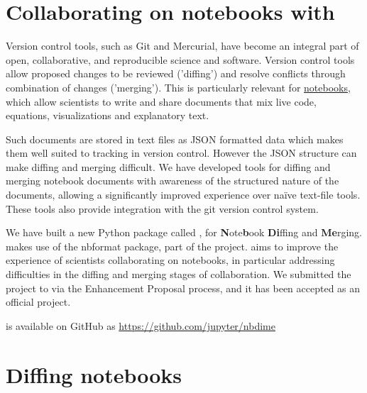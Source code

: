\documentclass{deliverablereport}
\author{Benjamin Ragan-Kelley \& Martin Sandve Aln\ae{}s \& Vidar Fauske}
\begin{document}
\maketitle
\githubissuedescription
\tableofcontents
\clearpage

\section{Collaborating on \Jupyter notebooks with \nbdime}

Version control tools, such as Git and Mercurial, have become an
integral part of open, collaborative, and reproducible science and
software. Version control tools allow proposed changes to be reviewed
('diffing') and resolve conflicts through combination of changes
('merging'). This is particularly relevant for
\href{http://jupyter.org}{\Jupyter notebooks}, which allow scientists
to write and share documents that mix live code, equations,
visualizations and explanatory text.

Such documents are stored in text files as JSON formatted data which
makes them well suited to tracking in version control. However the
JSON structure can make diffing and merging difficult.  We have
developed tools for diffing and merging notebook documents with
awareness of the structured nature of the documents, allowing a
significantly improved experience over naïve text-file tools.  These
tools also provide integration with the git version control system.

We have built a new Python package called \nbdime, for \textbf{N}ote\textbf{b}ook \textbf{Di}ffing and \textbf{Me}rging.
\nbdime makes use of the nbformat package, part of the \Jupyter project.
\nbdime aims to improve the experience of scientists collaborating on notebooks,
in particular addressing difficulties in the diffing and merging stages of collaboration.
We submitted the project to \Jupyter via the \Jupyter Enhancement Proposal process,
and it has been accepted as an official \Jupyter project.

\nbdime is available on GitHub as \url{https://github.com/jupyter/nbdime}

\section{Diffing notebooks} %
\label{sec:diffing_notebooks}
\end{document}
